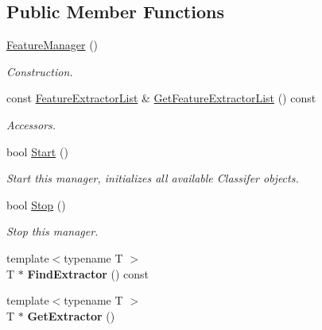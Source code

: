 \subsection*{Public Member Functions}
\begin{DoxyCompactItemize}
\item 
\mbox{\label{class_feature_manager_a4e0ef0a55579bdaefc85970cb492b1bb}} 
\hyperlink{class_feature_manager_a4e0ef0a55579bdaefc85970cb492b1bb}{Feature\+Manager} ()
\begin{DoxyCompactList}\small\item\em Construction. \end{DoxyCompactList}\item 
\mbox{\label{class_feature_manager_a365f702520b97592e1abff59eb907f2b}} 
const \hyperlink{class_feature_manager_ac5e551b04984aaab5e31391e934208bb}{Feature\+Extractor\+List} \& \hyperlink{class_feature_manager_a365f702520b97592e1abff59eb907f2b}{Get\+Feature\+Extractor\+List} () const
\begin{DoxyCompactList}\small\item\em Accessors. \end{DoxyCompactList}\item 
\mbox{\label{class_feature_manager_ae22e14ad392ba3a7e23dccb40e7da30a}} 
bool \hyperlink{class_feature_manager_ae22e14ad392ba3a7e23dccb40e7da30a}{Start} ()
\begin{DoxyCompactList}\small\item\em Start this manager, initializes all available Classifer objects. \end{DoxyCompactList}\item 
\mbox{\label{class_feature_manager_aa84b4f17c9b92744ff06e4f92fe92904}} 
bool \hyperlink{class_feature_manager_aa84b4f17c9b92744ff06e4f92fe92904}{Stop} ()
\begin{DoxyCompactList}\small\item\em Stop this manager. \end{DoxyCompactList}\item 
\mbox{\label{class_feature_manager_a3e5e9a2474841c6fff77cd2c95598611}} 
{\footnotesize template$<$typename T $>$ }\\T $\ast$ {\bfseries Find\+Extractor} () const
\item 
\mbox{\label{class_feature_manager_a0f82bb48dd79d49d62e083421165af34}} 
{\footnotesize template$<$typename T $>$ }\\T $\ast$ {\bfseries Get\+Extractor} ()
\end{DoxyCompactItemize}


